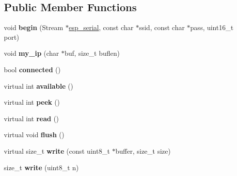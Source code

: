 \subsection*{Public Member Functions}
\begin{DoxyCompactItemize}
\item 
\mbox{\label{class_esp_server_a1d8682ca0934af03639311e23a71283f}} 
void {\bfseries begin} (Stream $\ast$\mbox{\hyperlink{_arduinopart_8ino_af690b3a6882292855c4091ede8039998}{esp\+\_\+serial}}, const char $\ast$ssid, const char $\ast$pass, uint16\+\_\+t port)
\item 
\mbox{\label{class_esp_server_a01953c4cc039c37f94dc3e1057126abb}} 
void {\bfseries my\+\_\+ip} (char $\ast$buf, size\+\_\+t buflen)
\item 
\mbox{\label{class_esp_server_a59fc494d53391b27e2fd75cb750690d9}} 
bool {\bfseries connected} ()
\item 
\mbox{\label{class_esp_server_a4549a76725f2e4c013e4d57018366109}} 
virtual int {\bfseries available} ()
\item 
\mbox{\label{class_esp_server_a9040fa1d479d71edf3a826f4691c35c4}} 
virtual int {\bfseries peek} ()
\item 
\mbox{\label{class_esp_server_aaab5dab5b969a87f538242e524431637}} 
virtual int {\bfseries read} ()
\item 
\mbox{\label{class_esp_server_adac116554b543b7c4228c018a85882f5}} 
virtual void {\bfseries flush} ()
\item 
\mbox{\label{class_esp_server_a7c66fc8d559f4956d4ccea196299bca7}} 
virtual size\+\_\+t {\bfseries write} (const uint8\+\_\+t $\ast$buffer, size\+\_\+t size)
\item 
\mbox{\label{class_esp_server_af32c245c813bbadb566538bba418b0fe}} 
size\+\_\+t {\bfseries write} (uint8\+\_\+t n)
\item 
\mbox{\label{class_esp_server_a0ba52a995edf9b6c2cdf3d396be84ff1}} 

\end{DoxyCompactItemize}
